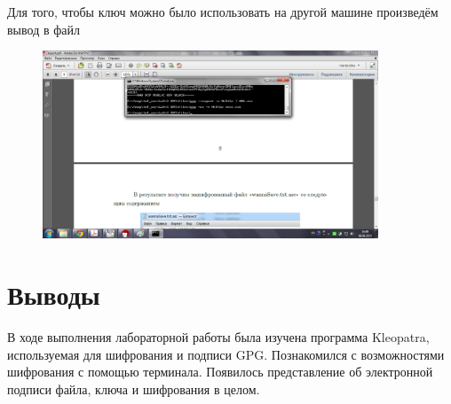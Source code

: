 \documentclass[utf8x, 12pt]{G7-32}
\begin{document}
Для того, чтобы ключ можно было использовать на другой машине произведём вывод в файл 

\begin{figure}[hhh!]
	\begin{center}
		\includegraphics[width=10cm]{img2/284}
	\end{center}
\end{figure}	




\chapter{Выводы}

В ходе выполнения лабораторной работы была изучена программа Kleopatra, используемая для шифрования и подписи GPG. Познакомился с возможностями шифрования с помощью терминала. Появилось представление об электронной подписи файла, ключа и шифрования в целом.
\end{document}
